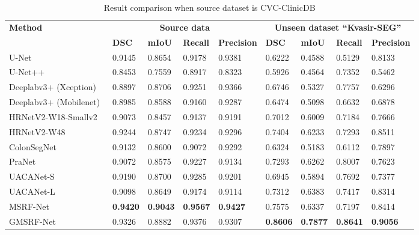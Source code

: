 \documentclass[conference]{IEEEtran}
\begin{document}
\begin{table*}[!t]
\centering
\footnotesize
\caption{Result comparison when source dataset is CVC-ClinicDB}
\begin{tabular}{@{}l|l|l|l|l|l|l|l|l@{}}
\toprule
\multirow{2}{*}{\textbf{Method}} & \multicolumn{4}{|c}{\bf Source data} & \multicolumn{4}{|c}{\bf Unseen dataset ``Kvasir-SEG''} \\ 
& \textbf{DSC} & \textbf{mIoU} & \textbf{Recall} & \textbf{Precision} & \textbf{DSC} & \textbf{mIoU} & \textbf{Recall} & \textbf{Precision} \\
\hline
U-Net~\cite{ronneberger2015u}  & 0.9145 & 0.8654 &0.9178 &0.9381 & 0.6222 & 0.4588 & 0.5129 & 0.8133\\ \hline

U-Net++~\cite{zhou2019unet++} & 0.8453 & 0.7559 & 0.8917 & 0.8323 & 0.5926 & 0.4564 & 0.7352 & 0.5462\\ \hline

Deeplabv3+ (Xception)~\cite{chen2018encoder} & 0.8897 & 0.8706 & 0.9251 & 0.9366 & 0.6746 & 0.5327 & 0.7757 & 0.6296\\\hline

Deeplabv3+ (Mobilenet)~\cite{chen2018encoder} & 0.8985 & 0.8588 & 0.9160 & 0.9287 & 0.6474 & 0.5098 & 0.6632 & 0.6878 \\ \hline

HRNetV2-W18-Smallv2~\cite{Wang_2020} & 0.9073 & 0.8457 & 0.9137 & 0.9191 & 0.7012 & 0.6009 & 0.7184 & 0.7666 \\ \hline 

HRNetV2-W48~\cite{Wang_2020} & 0.9244 & 0.8747 & 0.9234 & 0.9296 & 0.7404 & 0.6233 & 0.7293 & 0.8511\\ \hline

ColonSegNet~\cite{jha2020real} & 0.9132 & 0.8600 & 0.9072 & 0.9292 & 0.6324 & 0.5183 & 0.6112 & 0.7897 \\ \hline

PraNet~\cite{fan2020pranet}  & 0.9072 & 0.8575 & 0.9227 & 0.9134 & 0.7293 & 0.6262 & 0.8007 & 0.7623\\ \hline

UACANet-S~\cite{kim2021uacanet} & 0.9190 & 0.8700 & 0.9285 & 0.9201 & 0.6945 & 0.5894 & 0.7692 & 0.7377\\ \hline

UACANet-L~\cite{kim2021uacanet}& 0.9098 & 0.8649 & 0.9174  & 0.9114 & 0.7312  & 0.6383 & 0.7417 & 0.8314\\ \hline

MSRF-Net~\cite{srivastava2021msrf} & \textbf{0.9420} & \textbf{0.9043} & \textbf{0.9567} & \textbf{0.9427} & 0.7575 & 0.6337 &0.7197 &0.8414 \\ \hline
GMSRF-Net & 0.9326 & 0.8882 &  0.9376 & 0.9307 & \textbf{0.8606} & \textbf{0.7877} & \textbf{0.8641} & \textbf{0.9056} \\ \hline
\bottomrule
\end{tabular}
\label{tab:result2}
\end{table*}
\end{document}
